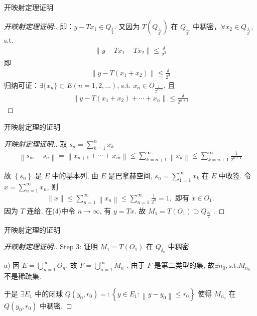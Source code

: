 \documentclass[sans,mathserif]{beamer} %
\begin{document}
\begin{frame}{开映射定理证明}
\begin{proof}[开映射定理证明:]
即：$y-Tx_{1} \in Q_{\frac{\delta}{2}}$. 又因为 $T(Q_{\frac{1}{2^2}})$ 在 $Q_{\frac{1}{2^2}}$ 中稠密，$\forall x_{2}\in Q_{\frac{1}{2^2}}$, s.t.
\begin{align*}
	\|y-Tx_{1}-Tx_{2}\|\leq \frac{\delta}{2^3}
	\end{align*}
即
\begin{align*}
	\|y-T(x_{1}+x_{2})\|\leq \frac{\delta}{2^3}
\end{align*}
归纳可证：$\exists \{x_{n}\}\subset E (n=1,2,...)$, s.t. $x_{n}\in O_{\frac{1}{2^{n+1}}}$, 且
\begin{align}
	\|y-T(x_{1}+x_{2})+\cdots+x_{n}\|\leq \frac{\delta}{2^{n+1}}
\end{align}
\end{proof}
\end{frame}

\begin{frame}{开映射定理的证明}
\begin{proof}[开映射定理证明:]
	取 $s_{n}=\sum_{k=1}^{n}x_{k}$
\begin{align*}
	\left\|s_{m}-s_{n}\right\|=\left\|x_{n+1}+\cdots+x_{m}\right\| \leq \sum_{k=n+1}^{\infty}\left\|x_{k}\right\| \leq \sum_{k=n+1}^{\infty} \frac{1}{2^{n+1}}
\end{align*}

故  $\left\{s_{n}\right\}$  是 $ E $ 中的基本列, 由 $ E $ 是巴拿赫空间,  $s_{n}=\sum_{1=1}^{\infty} x_{k}$  在 $ E $ 中收签.
令  $x=\sum_{n=1}^{\infty} x_{n}$,  则
\begin{align*}
	\|x\| \leq \sum_{n=1}^{\infty}\left\|x_{n}\right\| \leq \sum_{n=1}^{\infty} \frac{1}{2^{n}}=1, \text { 即有 } x \in O_{1} .
\end{align*}
因为 $T$ 连给, 在(4)中令 $ n \rightarrow \infty$,  有 $ y=T x$.  故  $M_{1}=T\left(O_{1}\right) \supset Q_{\frac{\delta_{0}}{2}}$ .

\end{proof}
\end{frame}


\begin{frame}{开映射定理的证明}
	\begin{proof}[开映射定理证明:]

		Step 3:  证明 $ M_{1}=T\left(O_{1}\right)$ 在  $Q_{\delta_{0}}$ 中稠密.

a) 因  $E=\bigcup_{n=1}^{\infty} O_{n}$,  故 $ F=\bigcup_{n=1}^{\infty} M_{n}$ .  由于 $ F $ 是第二类型的集, 故$\exists  n_{0}, \mathrm{s.t.}   M_{n_{0}}$  不是稀疏集.

于是  $\exists E_{1}$  中的闭球 $ Q\left(y_{0}, r_{0}\right)=:\left\{y \in E_{1}:\left\|y-y_{0}\right\| \leq r_{0}\right\}$  使得  $M_{n_{0}} $
在  $Q\left(y_{0}, r_{0}\right)$  中稠密.


\end{proof}
\end{frame}
\end{document}
